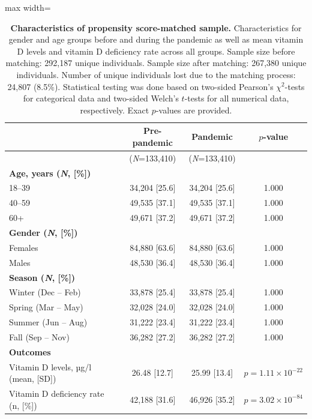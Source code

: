 \documentclass[12pt]{article}
\begin{document}
\begin{appendices}
\begin{table}
    \centering
\caption[Characteristics of propensity score-matched sample]{\textbf{Characteristics of propensity score-matched sample.} Characteristics for gender and age groups before and during the pandemic as well as mean vitamin D levels and vitamin D deficiency rate across all groups. Sample size before matching: 292,187 unique individuals. Sample size after matching: 267,380 unique individuals. Number of unique individuals lost due to the matching process: 24,807 (8.5\%). Statistical testing was done based on two-sided Pearson's $\chi^2$-tests for categorical data and two-sided Welch's $t$-tests for all numerical data, respectively. Exact $p$-values are provided.}
\label{supptab:results_psm}
\footnotesize
\begin{adjustbox}{max width=\textwidth}
    \begin{tabular}{|l|c|c|c|}
    \hline
    \rowcolor{orange!20} & \textbf{Pre-pandemic} & \textbf{Pandemic} & \textbf{$p$-value}\\ \hline 
    \rowcolor{orange!20} & (\textit{N}=133,410)& (\textit{N}=133,410)&  \\ \hline
    \multicolumn{4}{|l|}{ \textbf{Age, years (\textit{N}, [\%])} } \\\hline
    18--39 & 34,204 [25.6]& 34,204 [25.6]& 1.000\\ \hline
    40--59 & 49,535 [37.1]& 49,535 [37.1]& 1.000\\ \hline
    60+ & 49,671 [37.2]& 49,671 [37.2]& 1.000\\ \hline
    \multicolumn{4}{|l|}{ \textbf{Gender (\textit{N}, [\%])} } \\ \hline
    Females& 84,880 [63.6]& 84,880 [63.6]& 1.000\\ \hline 
    Males& 48,530 [36.4]& 48,530 [36.4]& 1.000\\ \hline
    \multicolumn{4}{|l|}{ \textbf{Season (\textit{N}, [\%])} } \\ \hline 
 Winter (Dec -- Feb)& 33,878 [25.4]& 33,878 [25.4]&1.000\\ \hline 
 Spring (Mar -- May)& 32,028 [24.0]& 32,028 [24.0]&1.000\\ \hline 
 Summer (Jun -- Aug)& 31,222 [23.4]& 31,222 [23.4]&1.000\\ \hline 
 Fall (Sep -- Nov)& 36,282 [27.2]& 36,282 [27.2]&1.000\\ \hline
    \multicolumn{4}{|l|}{\textbf{Outcomes}} \\ \hline
    {Vitamin D levels, µg/l (mean, [SD])} & 26.48 [12.7]& 25.99 [13.4]& $p = 1.11 	\times 10^{-22}$\\ \hline
    {Vitamin D deficiency rate (n, [\%])} & 42,188 [31.6]& 46,926 [35.2]& $p = 3.02 	\times 10^{-84}$\\ \hline
\end{tabular}
\end{adjustbox}
\end{table}



\end{appendices}
\end{document}
